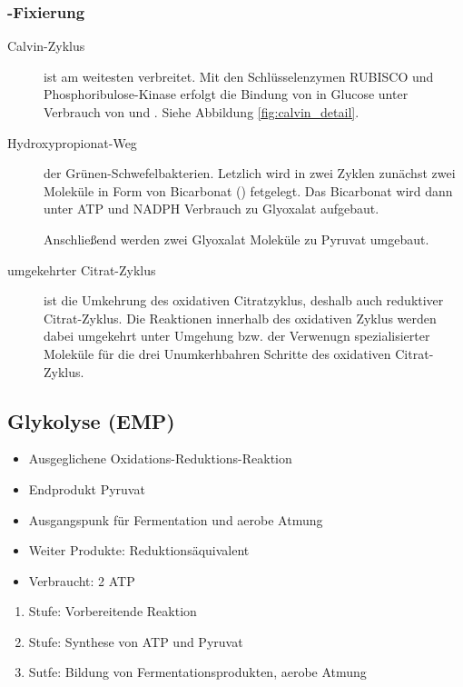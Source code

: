 \subsubsection{-Fixierung}
\begin{description}
	\item[Calvin-Zyklus] ist am weitesten verbreitet.
		Mit den Schlüsselenzymen RUBISCO und Phosphoribulose-Kinase
		erfolgt die Bindung von  in Glucose
		unter Verbrauch von  und .
		Siehe Abbildung \ref{fig:calvin_detail}.

	\item[Hydroxypropionat-Weg] der Grünen-Schwefelbakterien.
		Letzlich wird in zwei Zyklen zunächst zwei Moleküle 
		in Form von Bicarbonat () fetgelegt.
		Das Bicarbonat wird dann unter ATP und NADPH Verbrauch zu Glyoxalat aufgebaut.

		Anschließend werden zwei Glyoxalat Moleküle zu Pyruvat umgebaut.

	\item[umgekehrter Citrat-Zyklus] ist die Umkehrung des oxidativen Citratzyklus,
		deshalb auch reduktiver Citrat-Zyklus.
		Die Reaktionen innerhalb des oxidativen Zyklus werden dabei umgekehrt
		unter Umgehung bzw. der Verwenugn spezialisierter Moleküle für die 
		drei Unumkerhbahren Schritte des oxidativen Citrat-Zyklus.

\end{description}

\subsection{Glykolyse (EMP)}
\label{sec:glykolyse}
\begin{itemize}
	\item Ausgeglichene Oxidations-Reduktions-Reaktion
	\item Endprodukt Pyruvat
	\item Ausgangspunk für Fermentation und aerobe Atmung
	\item Weiter Produkte: Reduktionsäquivalent 
	\item Verbraucht: 2 ATP

\end{itemize}

\begin{enumerate}
	\item Stufe: Vorbereitende Reaktion
	\item Stufe: Synthese von ATP und Pyruvat
	\item Sutfe: Bildung von Fermentationsprodukten, aerobe Atmung
\end{enumerate}

